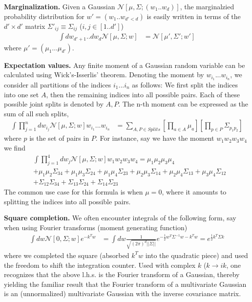 {\bf Marginalization.} Given a Gaussian $\mathcal{N}[\mu,\Sigma;(w_1..w_d)]$, the marginalzied probability distribution for $w'=(w_1..w_{d'<d})$ is easily written in terms of the $d'\times d'$ matrix $\Sigma'_{ij}\equiv\Sigma_{ij}$ ($i,j \in [1..d']$) 
\begin{align}
\int dw_{d'+1}..dw_d \mathcal{N}[\mu,\Sigma;w] &= \mathcal{N}[\mu',\Sigma';w']
\end{align}
where $\mu'=(\mu_1...\mu_{d'})$. 

{\bf Expectation values.} Any finite moment of a Gaussian random variable can be calculated using Wick's-Isserlis' theorem. Denoting the moment by $w_{i_1}...w_{i_n}$, we consider all partitions of the indices $i_1...i_n$ as follows: We first split the indices into one set $A$, then the remaining indices into all possible pairs. Each of these possible joint splits is denoted by $A,P$. The n-th moment can be expressed as the sum of all such splits, 
\begin{align}
\label{Eq:WickWithAverage}
\int \prod_{j=1}^n dw_{i_j} \mathcal{N}[\mu,\Sigma;w] w_{i_1}...w_{i_n} &= \sum_{A,P \in Splits} [\prod_{a \in A} \mu_a][\prod_{p \in P} \Sigma_{p_1 p_2}] 
\end{align}
where $p$ is the set of pairs in $P$. For instance, say we have the moment $w_1 w_2 w_3 w_4$ we find 
\begin{align}
&\int \prod_{j=1}^4dw_j \mathcal{N}[\mu,\Sigma;w] w_{1}w_{2}w_{3}w_4 = \mu_1 \mu_2 \mu_3 \mu_4 \\ \nonumber 
&+ \mu_1 \mu_2 \Sigma_{34} + \mu_1 \mu_3 \Sigma_{24} + \mu_1 \mu_4 \Sigma_{23} + \mu_2 \mu_3 \Sigma_{14} + \mu_2 \mu_4 \Sigma_{13} + \mu_3 \mu_4 \Sigma_{12} \\ \nonumber
&+ \Sigma_{12}\Sigma_{34}+\Sigma_{13}\Sigma_{24}+\Sigma_{14}\Sigma_{23}
\end{align}
The common use case for this formula is when $\mu=0$, where it amounts to splitting the indices into all possible pairs. 

{\bf Square completion.} We often encounter integrals of the following form, say when using Fourier transforms (moment generating function)
\begin{align}
\int dw \mathcal{N}[0,\Sigma;w] e^{-k^T w} &= \int dw \frac{1}{\sqrt{(2\pi)^d ||\Sigma||}} e^{-\frac{1}{2} w^T \Sigma^{-1} w-k^T w} = e^{\frac{1}{2} k^T \Sigma k}
\end{align}
where we completed the square (absorbed $k^T w$ into the quadratic piece) and used the freedom to shift the integration counter. Used with complex $k$ ($k \rightarrow ik$, one recognizes that the above l.h.s. is the Fourier transform of a Gaussian, thereby yielding the familiar result that the Fourier transform of a multivariate Gaussian is an (unnormalized) multivariate Gaussian with the inverse covariance matrix.


